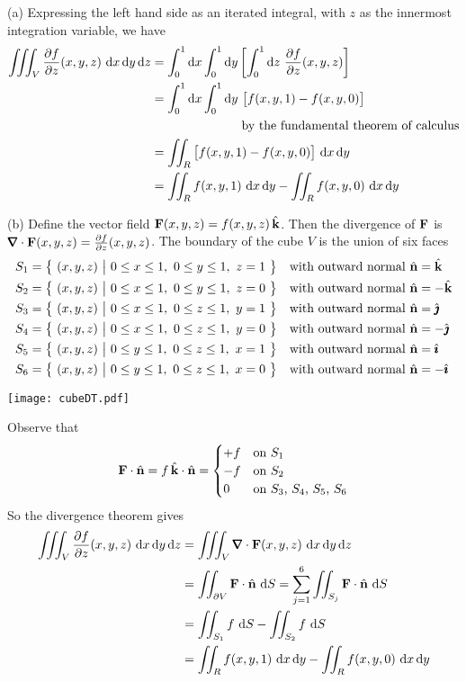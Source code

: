 \begin{solution} (a) Expressing the left hand side as an iterated integral,
with $z$ as the innermost integration variable, we have
\begin{align*}
\tripInt_V\frac{\partial f}{\partial z}(x,y,z)\ \dee{x}\,\dee{y}\,\dee{z}
&=\int_0^1\dee{x}\int_0^1\dee{y}\left[\int_0^1\dee{z}\ 
                \frac{\partial f}{\partial z}(x,y,z)\right] \\
&=\int_0^1\dee{x}\int_0^1\dee{y}\ \big[f(x,y,1)-f(x,y,0)\big] \\
&\hskip1in\text{by the fundamental theorem of calculus} \\
&=\dblInt_R\big[f(x,y,1)-f(x,y,0)\big]\ \dee{x}\,\dee{y} \\
&=\dblInt_R f(x,y,1)\ \dee{x}\,\dee{y}
  - \dblInt_R f(x,y,0)\ \dee{x}\,\dee{y}
\end{align*}


(b) Define the vector field $\mathbf{F}(x,y,z) = f(x,y,z)\,\hat{\mathbf{k}}$. Then the divergence 
of $\mathbf{F}$ is $\vnabla\cdot\vF(x,y,z) = \frac{\partial f}{\partial z}(x,y,z)$.
The boundary of the cube $V$ is the union of six faces
\begin{align*}
S_1&=\big\{ \ (x,y,z)\ \big|\ 0\le x\le 1,\ 0\le y\le 1,\ z=1\ \big\}\quad
   \text{with outward normal $\hat{\mathbf{n}}=\hat{\mathbf{k}}$} \\
S_2&=\big\{ \ (x,y,z)\ \big|\ 0\le x\le 1,\ 0\le y\le 1,\ z=0\ \big\}\quad
   \text{with outward normal $\hat{\mathbf{n}}=-\hat{\mathbf{k}}$} \\
S_3&=\big\{ \ (x,y,z)\ \big|\ 0\le x\le 1,\ 0\le z\le 1,\ y=1\ \big\}\quad
   \text{with outward normal $\hat{\mathbf{n}}=\hat{\pmb{\jmath}}$} \\
S_4&=\big\{ \ (x,y,z)\ \big|\ 0\le x\le 1,\ 0\le z\le 1,\ y=0\ \big\}\quad
   \text{with outward normal $\hat{\mathbf{n}}=-\hat{\pmb{\jmath}}$} \\
S_5&=\big\{ \ (x,y,z)\ \big|\ 0\le y\le 1,\ 0\le z\le 1,\ x=1\ \big\}\quad
   \text{with outward normal $\hat{\mathbf{n}}=\hat{\pmb{\imath}}$} \\
S_6&=\big\{ \ (x,y,z)\ \big|\ 0\le y\le 1,\ 0\le z\le 1,\ x=0\ \big\}\quad
   \text{with outward normal $\hat{\mathbf{n}}=-\hat{\pmb{\imath}}$} 
\end{align*}
\begin{center}
       \texttt{[image: cubeDT.pdf]}
\end{center}
Observe that
\begin{align*}
\mathbf{F}\cdot\hat{\mathbf{n}} = f\,\hat{\mathbf{k}}\cdot\hat{\mathbf{n}} = \begin{cases} +f &\text{on $S_1$} \\
                            -f &\text{on $S_2$} \\
                            0  &\text{on $S_3$, $S_4$, $S_5$, $S_6$}
             \end{cases}
\end{align*}
So the divergence theorem gives
\begin{align*}
\tripInt_V\frac{\partial f}{\partial z}(x,y,z)\ \dee{x}\,\dee{y}\,\dee{z}
&=\tripInt_V \vnabla\cdot\vF(x,y,z)\ \dee{x}\,\dee{y}\,\dee{z} \\
&= \dblInt_{\partial V} \vF\cdot\hn\ \dee{S}
=\sum_{j=1}^6  \dblInt_{S_j} \vF\cdot\hn\ \dee{S}\\
&=\dblInt_{S_1} f\ \dee{S}
     -\dblInt_{S_2} f\ \dee{S} \\
&=\dblInt_R f(x,y,1)\ \dee{x}\,\dee{y}
  - \dblInt_R f(x,y,0)\ \dee{x}\,\dee{y}
\end{align*}


\end{solution}
